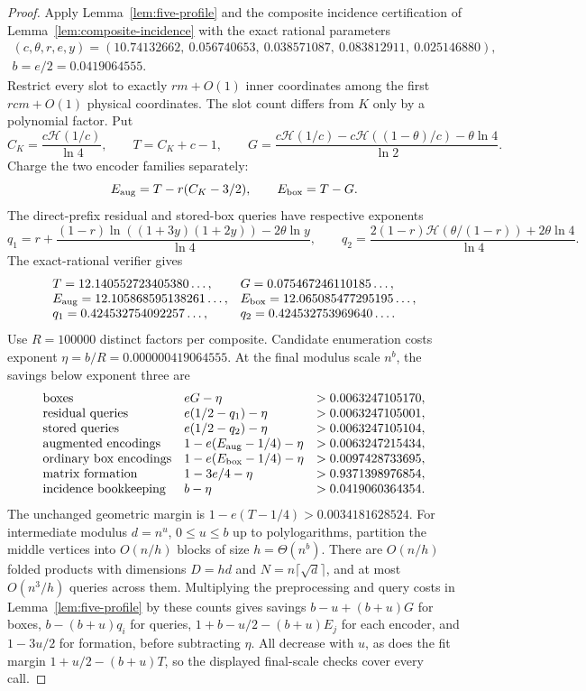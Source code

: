\documentclass[11pt]{article}
\newcommand{\HH}{\mathcal H}
\begin{document}
\begin{proof}
Apply Lemma~\ref{lem:five-profile} and the composite incidence
certification of Lemma~\ref{lem:composite-incidence} with the exact rational parameters
\[
\begin{gathered}
(c,\theta,r,e,y)=
(10.74132662,\ 0.056740653,\ 0.038571087,\ 0.083812911,\ 0.025146880),\\
b=e/2=0.0419064555.
\end{gathered}
\]
Restrict every slot to exactly $rm+O(1)$ inner coordinates among the first
$rcm+O(1)$ physical coordinates. The slot count differs from $K$ only by
a polynomial factor. Put
\[
C_K=\frac{c\HH(1/c)}{\ln4},\qquad T=C_K+c-1,\qquad
G=\frac{c\HH(1/c)-c\HH((1-\theta)/c)-\theta\ln4}{\ln2}.
\]
Charge the two encoder families separately:
\[
E_{\rm aug}=T-r(C_K-3/2),\qquad E_{\rm box}=T-G.
\]
The direct-prefix residual and stored-box queries have respective exponents
\[
q_1=r+\frac{(1-r)\ln((1+3y)(1+2y))-2\theta\ln y}{\ln4},\qquad
q_2=\frac{2(1-r)\HH(\theta/(1-r))+2\theta\ln4}{\ln4}.
\]
The exact-rational verifier gives
\[
\begin{array}{ll}
T=12.140552723405380\ldots,&G=0.075467246110185\ldots,\\
E_{\rm aug}=12.105868595138261\ldots,&E_{\rm box}=12.065085477295195\ldots,\\
q_1=0.424532754092257\ldots,&q_2=0.424532753969640\ldots.
\end{array}
\]
Use $R=100000$ distinct factors per composite. Candidate enumeration costs
exponent $\eta=b/R=0.000000419064555$. At the final modulus scale $n^b$,
the savings below exponent three are
\[
\begin{array}{lll}
\text{boxes}&eG-\eta&>0.0063247105170,\\
\text{residual queries}&e(1/2-q_1)-\eta&>0.0063247105001,\\
\text{stored queries}&e(1/2-q_2)-\eta&>0.0063247105104,\\
\text{augmented encodings}&1-e(E_{\rm aug}-1/4)-\eta&>0.0063247215434,\\
\text{ordinary box encodings}&1-e(E_{\rm box}-1/4)-\eta&>0.0097428733695,\\
\text{matrix formation}&1-3e/4-\eta&>0.9371398976854,\\
\text{incidence bookkeeping}&b-\eta&>0.0419060364354.
\end{array}
\]
The unchanged geometric margin is
$1-e(T-1/4)>0.0034181628524$.
For intermediate modulus $d=n^u$, $0\le u\le b$ up to polylogarithms,
partition the middle vertices into $O(n/h)$ blocks of size
$h=\Theta(n^b)$. There are $O(n/h)$ folded products with dimensions
$D=hd$ and $N=n\lceil\sqrt d\rceil$, and at most $O(n^3/h)$
queries across them. Multiplying the preprocessing and query costs in
Lemma~\ref{lem:five-profile} by these counts gives savings
$b-u+(b+u)G$ for boxes, $b-(b+u)q_i$ for queries,
$1+b-u/2-(b+u)E_j$ for each encoder, and $1-3u/2$ for formation,
before subtracting $\eta$. All decrease with $u$, as does the fit margin
$1+u/2-(b+u)T$, so the displayed final-scale checks cover every call.


\end{proof}
\end{document}
